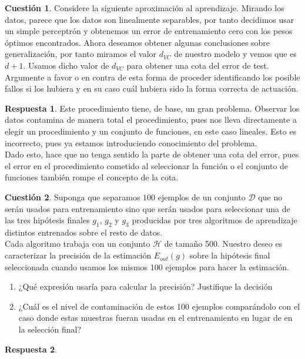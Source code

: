 \documentclass[10pt,a4paper]{article}
\theoremstyle{definition}
\newtheorem{cuestion}{Cuestión}
\newtheorem*{respuesta}{Respuesta}
\begin{document}
\begin{cuestion}
Considere la siguiente aproximación al aprendizaje. Mirando los datos, parece que los datos son linealmente separables, por tanto decidimos usar un simple perceptrón y obtenemos un error de entrenamiento cero con los pesos óptimos encontrados. Ahora deseamos obtener algunas conclusiones sobre generalización, por tanto miramos el valor $d_{VC}$ de nuestro modelo y vemos que es $d + 1$. Usamos dicho valor de $d_{VC}$ para obtener una cota del error de test. Argumente a favor o en contra de esta forma de proceder identificando los posible fallos si los hubiera y en su caso cuál hubiera sido la forma correcta de actuación.\\

\end{cuestion}
\begin{respuesta}
Este procedimiento tiene, de base, un gran problema. Observar los datos contamina de manera total el procedimiento, pues nos lleva directamente a elegir un procedimiento y un conjunto de funciones, en este caso lineales. Esto es incorrecto, pues ya estamos introduciendo conocimiento del problema.\\

Dado esto, hace que no tenga sentido la parte de obtener una cota del error, pues el error en el procedimiento cometido al seleccionar la función o el conjunto de funciones también rompe el concepto de la cota.\\
 
\end{respuesta}

\begin{cuestion}
Suponga que separamos $100$ ejemplos de un conjunto $\mathcal{D}$ que no serán usados para entrenamiento sino que serán usados para seleccionar una de las tres hipótesis finales $g_1$, $g_2$ y $g_3$ producidas por tres algoritmos de aprendizaje distintos entrenados sobre el resto de datos.\\
Cada algoritmo trabaja con un conjunto $\mathcal{H}$ de tamaño 500. Nuestro deseo es caracterizar la precisión de la estimación $E_{out}(g)$ sobre la hipótesis final seleccionada cuando usamos los mismos 100 ejemplos para hacer la estimación.
\begin{enumerate}[a]
\item ¿Qué expresión usaría para calcular la precisión? Justifique la decisión
\item ¿Cuál es el nivel de contaminación de estos 100 ejemplos comparándolo con el caso donde estas muestras fueran usadas en el entrenamiento en lugar de en la selección final?
\end{enumerate}
\end{cuestion}
\begin{respuesta}
\end{respuesta}
\end{document}
